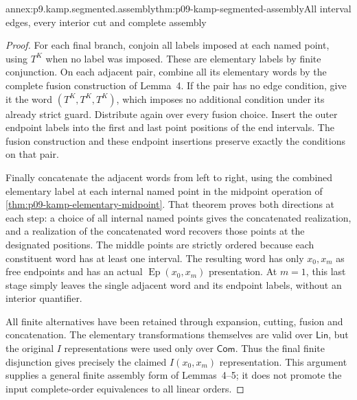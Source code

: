\begin{annexitem}{annex:p9.kamp.segmented.assembly}{thm:p09-kamp-segmented-assembly}{All interval edges, every interior cut and complete assembly}
\begin{proof}
For each final branch, conjoin all labels imposed at each named point,
using \(T^K\) when no label was imposed. These are elementary
labels by finite conjunction. On each adjacent pair, combine all its
elementary words by the complete fusion construction of Lemma~4.
If the pair has no edge condition, give it the word \((T^K,T^K,T^K)\),
which imposes no additional condition under its already strict guard.
Distribute again over every fusion choice. Insert the outer endpoint
labels into the first and last point positions of the end intervals.
The fusion construction and these endpoint insertions preserve exactly
the conditions on that pair.

Finally concatenate the adjacent words from left to right, using the
combined elementary label at each internal named point in the midpoint
operation of \cref{thm:p09-kamp-elementary-midpoint}. That theorem
proves both directions at each step: a choice of all internal named
points gives the concatenated realization, and a realization of the
concatenated word recovers those points at the designated positions.
The middle points are strictly ordered because each constituent word
has at least one interval. The resulting word has only \(x_0,x_m\)
as free endpoints and has an actual \(\operatorname{Ep}(x_0,x_m)\)
presentation. At \(m=1\), this last stage simply leaves the single
adjacent word and its endpoint labels, without an interior quantifier.

All finite alternatives have been retained through expansion, cutting,
fusion and concatenation. The elementary transformations themselves
are valid over \(\mathsf{Lin}\), but the original \(I\)
representations were used only over \(\mathsf{Com}\).
Thus the final finite disjunction gives precisely the claimed
\(I(x_0,x_m)\) representation. This argument supplies a
general finite assembly form of Lemmas~4--5; it does not promote
the input complete-order equivalences to all linear orders.
\end{proof}
\end{annexitem}

